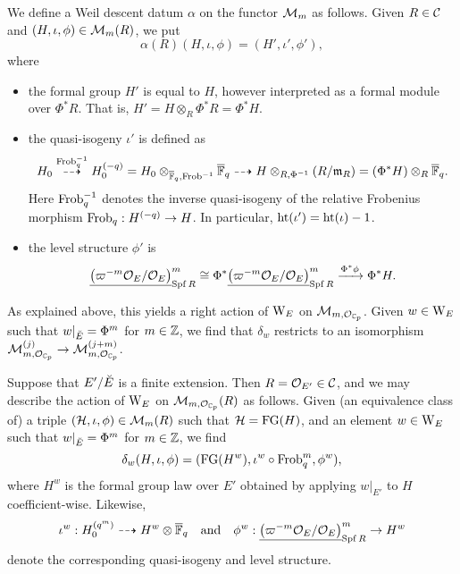 \documentclass[../main.tex]{subfiles}
\begin{document}
We define a Weil descent datum $\alpha$ on the functor $\mathcal{M}_m$ as follows. 
Given $R\in \mathcal{C}$ and $(H, \iota, \phi) \in \mathcal{M}_m(R)$, we put
\begin{equation*}
  \alpha(R) \left( H, \iota, \phi \right) = (H', \iota',\phi'),
\end{equation*}
where
\begin{itemize}
  \item the formal group $H'$ is equal to $H$, however interpreted as a formal
    module over $\Phi^*R$. That is, $H' = H \otimes_{R} \Phi^* R = \Phi^* H$.
  \item the quasi-isogeny $\iota'$ is defined as
    \begin{equation*}
      H_0 \overset{\mathrm{Frob}_q^{-1}}{\dashrightarrow} H_0^{(-q)} = H_0
      \otimes_{\overline {\mathbb{F}}_q, \mathrm{Frob}^{-1}}
      \overline {\mathbb{F}}_q \dashrightarrow H \otimes_{R, \Phi^{-1}} (R/\mathfrak{m}_R) = (\Phi^*
      H) \otimes_R \overline {\mathbb{F}}_q.
    \end{equation*}
    Here $\mathrm{Frob}_q^{-1}$ denotes the inverse quasi-isogeny of the relative
    Frobenius morphism $\mathrm{Frob}_q: H^{(-q)} \to H$. In particular, 
    $\textnormal{ht}(\iota') = \textnormal{ht}(\iota)-1$.
  \item the level structure $\phi'$ is
    \begin{equation*}
      \underline{\left({\varpi^{-m}\mathcal{O}_E}/{\mathcal{O}_E} \right)}^m_{\operatorname{Spf} R}
      \cong \Phi^* \underline{\left({\varpi^{-m}\mathcal{O}_E}/{\mathcal{O}_E} \right)}^m_{\operatorname{Spf} R}
      \xrightarrow{\Phi^* \phi} \Phi^* H.
    \end{equation*}
\end{itemize}

As explained above, this yields a right action of $\mathrm W_E$ on $\mathcal{M}_{m, \mathcal{O}_{\mathbb{C}_p}}$.
Given $w \in \mathrm W_E$ such that $w|_{\breve {E}} = \Phi^m$ for $m \in \mathbb{Z}$, we find
that $\delta_w$ restricts to an isomorphism $\mathcal{M}_{m, \mathcal{O}_{\mathbb{C}_p}}^{(j)} \to \mathcal{M}_{m,
\mathcal{O}_{\mathbb{C}_p}}^{(j+m)}$. 

\begin{xpl}
  Suppose that $E'/{\breve {E}}$ is a finite extension. Then $R = \mathcal{O}_{E'} \in \mathcal{C}$, 
  and we may describe the action of $\mathrm W_E$ on 
  $\mathcal{M}_{m, \mathcal{O}_{\mathbb{C}_p}}(R)$ as follows. Given (an equivalence class of)
  a triple $(\mathcal{H}, \iota, \phi) \in \mathcal{M}_m(R)$ such that 
  $\mathcal{H} = \textnormal{FG}(H)$, and an element $w \in \mathrm W_E$ such that 
  $w|_{{\breve {E}}} = \Phi^m$ for $m \in \mathbb{Z}$, we find 
  $$\delta_w(H, \iota, \phi) = (\textnormal{FG}(H^w), \iota^w \circ \mathrm{Frob}_q^m, \phi^w),$$ 
  where $H^w$ is the formal group law over $E'$ obtained by applying 
  $w|_{E'}$ to $H$ coefficient-wise. Likewise, 
  $$\iota^w: H_0^{(q^m)} \dashrightarrow H^w \otimes \overline {\mathbb{F}}_q
  \quad \text{and} \quad
  \phi^w:  \underline{\left({\varpi^{-m}\mathcal{O}_E}/{\mathcal{O}_E} \right)}^m_{\operatorname{Spf} R}
      \to H^w$$
  denote the corresponding quasi-isogeny and level structure.
\end{xpl}
\end{document}
